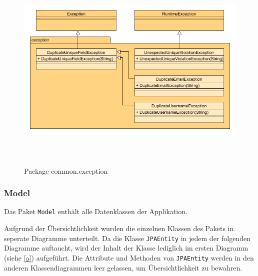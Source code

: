 \begin{figure}[H]
	\centering
  \includegraphics[width=\textwidth,height=10cm,keepaspectratio]{../UMLDiagramme/common/exception/gfx/4_package_exception.png}
	\caption{Package common.exception}
\end{figure}


\newpage
\subsubsection{Model}

Das Paket \texttt{Model} enthält alle Datenklassen der Applikation.

Aufgrund der Übersichtlichkeit wurden die einzelnen Klassen des Pakets in seperate Diagramme unterteilt. Da die Klasse \texttt{JPAEntity} in jedem der folgenden Diagramme auftaucht, wird der Inhalt der Klasse lediglich im ersten Diagramm (siehe \ref{a}) aufgeführt. Die Attribute und Methoden von \texttt{JPAEntity} werden in den anderen Klassendiagrammen leer gelassen, um Übersichtlichkeit zu bewahren.

